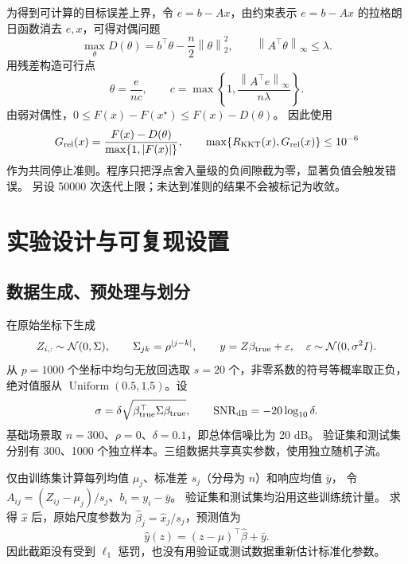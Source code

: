 \documentclass[UTF8,11pt,a4paper,fontset=fandol]{ctexart}
\newcommand{\norm}[1]{\left\|#1\right\|}
\begin{document}
为得到可计算的目标误差上界，令 $e=b-Ax$，由约束表示
$e=b-Ax$ 的拉格朗日函数消去 $e,x$，可得对偶问题
\begin{equation}
 \max_\theta D(\theta)=b^\top\theta-\frac n2\norm{\theta}_2^2,
 \qquad \norm{A^\top\theta}_\infty\le\lambda.
\end{equation}
用残差构造可行点
\begin{equation}
 \theta=\frac{e}{n c},\qquad
 c=\max\left\{1,\frac{\norm{A^\top e}_\infty}{n\lambda}\right\}.
\end{equation}
由弱对偶性，$0\le F(x)-F(x^\star)\le F(x)-D(\theta)$。
因此使用
\begin{equation}
 G_{\rm rel}(x)=\frac{F(x)-D(\theta)}{\max\{1,|F(x)|\}},\qquad
 \max\{R_{\rm KKT}(x),G_{\rm rel}(x)\}\le10^{-6}
 \label{eq:stop}
\end{equation}
作为共同停止准则。程序只把浮点舍入量级的负间隙截为零，显著负值会触发错误。
另设 50000 次迭代上限；未达到准则的结果不会被标记为收敛。

\section{实验设计与可复现设置}
\subsection{数据生成、预处理与划分}
在原始坐标下生成
\begin{equation}
 Z_{i,:}\sim\mathcal{N}(0,\Sigma),\qquad
 \Sigma_{jk}=\rho^{|j-k|},\qquad
 y=Z\beta_{\rm true}+\varepsilon,\quad
 \varepsilon\sim\mathcal{N}(0,\sigma^2I).
\end{equation}
从 $p=1000$ 个坐标中均匀无放回选取 $s=20$ 个，非零系数的符号等概率取正负，
绝对值服从 $\operatorname{Uniform}(0.5,1.5)$。设
\begin{equation}
 \sigma=\delta\sqrt{\beta_{\rm true}^\top\Sigma\beta_{\rm true}},
 \qquad \operatorname{SNR}_{\rm dB}=-20\log_{10}\delta.
\end{equation}
基础场景取 $n=300$、$\rho=0$、$\delta=0.1$，即总体信噪比为 20 dB。
验证集和测试集分别有 300、1000 个独立样本。三组数据共享真实参数，使用独立随机子流。

仅由训练集计算每列均值 $\mu_j$、标准差 $s_j$（分母为 $n$）和响应均值 $\bar y$，
令 $A_{ij}=(Z_{ij}-\mu_j)/s_j$、$b_i=y_i-\bar y$。
验证集和测试集均沿用这些训练统计量。
求得 $\hat x$ 后，原始尺度参数为 $\hat\beta_j=\hat x_j/s_j$，预测值为
\begin{equation}
 \hat y(z)=(z-\mu)^\top\hat\beta+\bar y.
\end{equation}
因此截距没有受到 $\ell_1$ 惩罚，也没有用验证或测试数据重新估计标准化参数。
\end{document}
